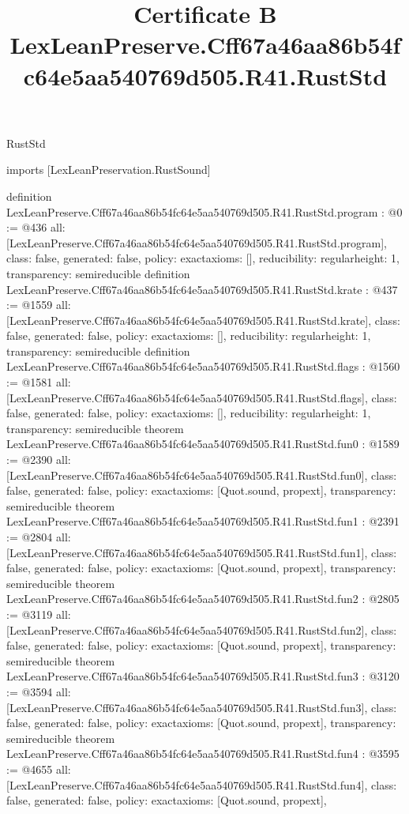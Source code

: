 \begin{lexlean}{RustStd}
\title{Certificate B LexLeanPreserve.Cff67a46aa86b54fc64e5aa540769d505.R41.RustStd}
\begin{coremodule}
imports [LexLeanPreservation.RustSound]

definition LexLeanPreserve.Cff67a46aa86b54fc64e5aa540769d505.R41.RustStd.program : @0 := @436 {
  all: [LexLeanPreserve.Cff67a46aa86b54fc64e5aa540769d505.R41.RustStd.program],
  class: false,
  generated: false,
  policy: exact{axioms: []},
  reducibility: regular{height: 1},
  transparency: semireducible
}
definition LexLeanPreserve.Cff67a46aa86b54fc64e5aa540769d505.R41.RustStd.krate : @437 := @1559 {
  all: [LexLeanPreserve.Cff67a46aa86b54fc64e5aa540769d505.R41.RustStd.krate],
  class: false,
  generated: false,
  policy: exact{axioms: []},
  reducibility: regular{height: 1},
  transparency: semireducible
}
definition LexLeanPreserve.Cff67a46aa86b54fc64e5aa540769d505.R41.RustStd.flags : @1560 := @1581 {
  all: [LexLeanPreserve.Cff67a46aa86b54fc64e5aa540769d505.R41.RustStd.flags],
  class: false,
  generated: false,
  policy: exact{axioms: []},
  reducibility: regular{height: 1},
  transparency: semireducible
}
theorem LexLeanPreserve.Cff67a46aa86b54fc64e5aa540769d505.R41.RustStd.fun0 : @1589 := @2390 {
  all: [LexLeanPreserve.Cff67a46aa86b54fc64e5aa540769d505.R41.RustStd.fun0],
  class: false,
  generated: false,
  policy: exact{axioms: [Quot.sound, propext]},
  transparency: semireducible
}
theorem LexLeanPreserve.Cff67a46aa86b54fc64e5aa540769d505.R41.RustStd.fun1 : @2391 := @2804 {
  all: [LexLeanPreserve.Cff67a46aa86b54fc64e5aa540769d505.R41.RustStd.fun1],
  class: false,
  generated: false,
  policy: exact{axioms: [Quot.sound, propext]},
  transparency: semireducible
}
theorem LexLeanPreserve.Cff67a46aa86b54fc64e5aa540769d505.R41.RustStd.fun2 : @2805 := @3119 {
  all: [LexLeanPreserve.Cff67a46aa86b54fc64e5aa540769d505.R41.RustStd.fun2],
  class: false,
  generated: false,
  policy: exact{axioms: [Quot.sound, propext]},
  transparency: semireducible
}
theorem LexLeanPreserve.Cff67a46aa86b54fc64e5aa540769d505.R41.RustStd.fun3 : @3120 := @3594 {
  all: [LexLeanPreserve.Cff67a46aa86b54fc64e5aa540769d505.R41.RustStd.fun3],
  class: false,
  generated: false,
  policy: exact{axioms: [Quot.sound, propext]},
  transparency: semireducible
}
theorem LexLeanPreserve.Cff67a46aa86b54fc64e5aa540769d505.R41.RustStd.fun4 : @3595 := @4655 {
  all: [LexLeanPreserve.Cff67a46aa86b54fc64e5aa540769d505.R41.RustStd.fun4],
  class: false,
  generated: false,
  policy: exact{axioms: [Quot.sound, propext]},
}
\end{coremodule}
\end{lexlean}
